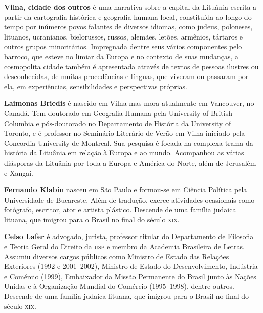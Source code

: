 \textbf{Vilna, cidade dos outros} é uma narrativa sobre a capital da Lituânia escrita a partir da cartografia histórica e geografia humana local, constituída ao longo do tempo por inúmeros povos falantes de diversos idiomas, como judeus, poloneses, lituanos, ucranianos, bielorussos, russos, alemães, letões, armênios, tártaros e outros grupos minoritários. Impregnada dentre seus vários componentes pelo barroco, que esteve no limiar da Europa e no contexto de suas mudanças, a cosmopolita cidade também é apresentada através de textos de pessoas ilustres ou desconhecidas, de muitas procedências e línguas, que viveram ou passaram por ela, em experiências, sensibilidades e perspectivas próprias.

\textbf{Laimonas Briedis} é nascido em Vilna mas mora atualmente em Vancouver, no Canadá. Tem doutorado em Geografia Humana pela University of British Columbia e pós-doutorado no Departamento de História da University of Toronto, e é professor no Seminário Literário de Verão em Vilna iniciado pela Concordia University de Montreal. Sua pesquisa é focada na complexa trama da história da Lituânia em relação à Europa e ao mundo. Acompanhou as várias diásporas da Lituânia por toda a Europa e América do Norte, além de Jerusalém e Xangai.

\textbf{Fernando Klabin} nasceu em São Paulo e formou-se em Ciência Política pela Universidade de Bucareste. Além de tradução, exerce atividades ocasionais como fotógrafo, escritor, ator e artista plástico. Descende de uma família judaica lituana, que imigrou para o Brasil no final do século \textsc{xix}.

\textbf{Celso Lafer} é advogado, jurista, professor titular do Departamento de Filosofia e Teoria Geral do Direito da \textsc{usp} e membro da Academia Brasileira de Letras. Assumiu diversos cargos públicos como Ministro de Estado das Relações Exteriores (1992 e 2001--2002), Ministro de Estado do Desenvolvimento, Indústria e Comércio (1999), Embaixador da Missão Permanente do Brasil junto às Nações Unidas e à Organização Mundial do Comércio (1995--1998), dentre outros. Descende de uma família judaica lituana, que imigrou para o Brasil no final do século \textsc{xix}.